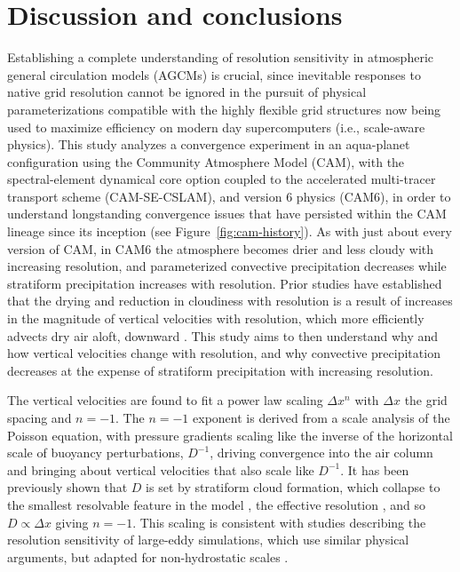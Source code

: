 \documentclass[times]{qjrms4}
\begin{document}
\section{Discussion and conclusions}

Establishing a complete understanding of resolution sensitivity in atmospheric general circulation models (AGCMs) is crucial, since inevitable responses to native grid resolution cannot be ignored in the pursuit of physical parameterizations compatible with the highly flexible grid structures now being used to maximize efficiency on modern day supercomputers (i.e., scale-aware physics). This study analyzes a convergence experiment in an aqua-planet configuration using the Community Atmosphere Model (CAM), with the spectral-element dynamical core option coupled to the accelerated multi-tracer transport scheme (CAM-SE-CSLAM), and version 6 physics (CAM6), in order to understand longstanding convergence issues that have persisted within the CAM lineage since its inception (see Figure~\ref{fig:cam-history}). As with just about every version of CAM, in CAM6 the atmosphere becomes drier and less cloudy with increasing resolution, and parameterized convective precipitation decreases while stratiform precipitation increases with resolution. Prior studies have established that the drying and reduction in cloudiness with resolution is a result of increases in the magnitude of vertical velocities with resolution, which more efficiently advects dry air aloft, downward \citep{KW1991JGR,WETAL1995CD,HR2017JCLIM}. This study aims to then understand why and how vertical velocities change with resolution, and why convective precipitation decreases at the expense of stratiform precipitation with increasing resolution.

The vertical velocities are found to fit a power law scaling $\Delta x^n$ with $\Delta x$ the grid spacing and $n=-1$. The $n=-1$ exponent is derived from a scale analysis of the Poisson equation, with pressure gradients scaling like the inverse of the horizontal scale of buoyancy perturbations, $D^{-1}$, driving convergence into the air column and bringing about vertical velocities that also scale like $D^{-1}$. It has been previously shown that $D$ is set by stratiform cloud formation, which collapse to the smallest resolvable feature in the model \citep{HR2018JAMES}, the effective resolution \citep{S2011LNCSE}, and so $D \propto \Delta x$ giving $n=-1$. This scaling is consistent with studies describing the resolution sensitivity of large-eddy simulations, which use similar physical arguments, but adapted for non-hydrostatic scales \citep{WETAL1997MWR,PG2006JAS,JR2016QJRMS}.
\end{document}
